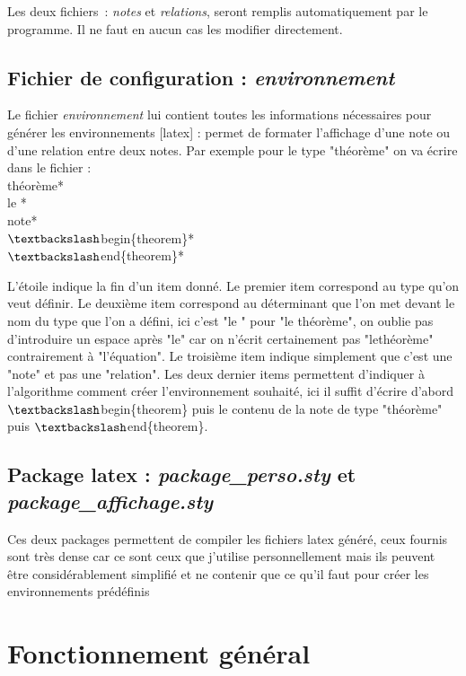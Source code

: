 \documentclass[12pt,a4paper]{article}
\begin{document}
	Les deux fichiers : \textit{notes} et \textit{relations}, seront remplis automatiquement par le programme. Il ne faut en aucun cas les modifier directement.
	
	\subsection{Fichier de configuration : \textit{environnement}}
	
	 Le fichier \textit{environnement} lui contient toutes les informations nécessaires pour générer les environnements [latex] : permet de formater l'affichage d'une note ou d'une relation entre deux notes. Par exemple pour le type "théorème" on va écrire dans le fichier :\\
	 théorème*\\
	 le *\\
	 note*\\
	 $\textbackslash$begin\{theorem\}*\\
	 $\textbackslash$end\{theorem\}*
	 
	 L'étoile indique la fin d'un item donné. Le premier item correspond au type qu'on veut définir. Le deuxième item correspond au déterminant que l'on met devant le nom du type que l'on a défini, ici c'est "le " pour "le théorème", on oublie pas d'introduire un espace après "le" car on n'écrit certainement pas "lethéorème" contrairement à "l'équation". Le troisième item indique simplement que c'est une "note" et pas une "relation". Les deux dernier items permettent d'indiquer à l'algorithme comment créer l'environnement souhaité, ici il suffit d'écrire d'abord  $\textbackslash$begin\{theorem\} puis le contenu de la note de type "théorème" puis $\textbackslash$end\{theorem\}.
	
	\subsection{Package latex : \textit{package\_perso.sty} et \textit{package\_affichage.sty}}
	
	Ces deux packages permettent de compiler les fichiers latex généré, ceux fournis sont très dense car ce sont ceux que j'utilise personnellement mais ils peuvent être considérablement simplifié et ne contenir que ce qu'il faut pour créer les environnements prédéfinis 
	
	
	\section{Fonctionnement général}
	
\end{document}
